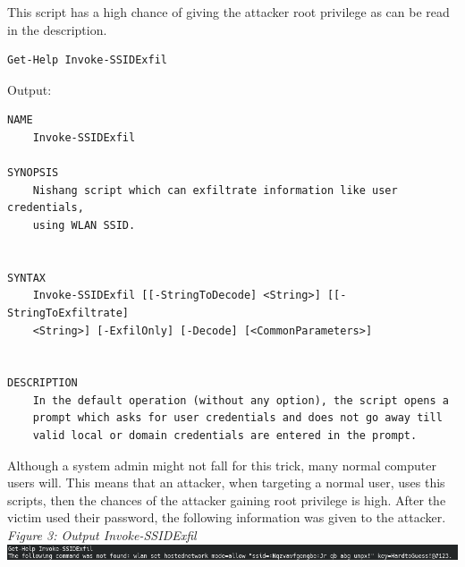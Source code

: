 \documentclass{article}%
\begin{document}
This script has a high chance of giving the attacker root privilege as can be read in the description.
\begin{verbatim}
Get-Help Invoke-SSIDExfil
\end{verbatim}
Output:
\begin{verbatim}
NAME
    Invoke-SSIDExfil
    
SYNOPSIS
    Nishang script which can exfiltrate information like user credentials,
    using WLAN SSID.
    
    
SYNTAX
    Invoke-SSIDExfil [[-StringToDecode] <String>] [[-StringToExfiltrate]
    <String>] [-ExfilOnly] [-Decode] [<CommonParameters>]
    
    
DESCRIPTION
    In the default operation (without any option), the script opens a
    prompt which asks for user credentials and does not go away till
    valid local or domain credentials are entered in the prompt.
\end{verbatim}
Although a system admin might not fall for this trick, many normal computer users will. This means that an attacker, when targeting a normal user, uses this scripts, then the chances of the attacker gaining root privilege is high.
After the victim used their password, the following information was given to the attacker.
\textit{Figure 3: Output Invoke-SSIDExfil}\\
\includegraphics[scale=0.5]{result.png}
\end{document}
